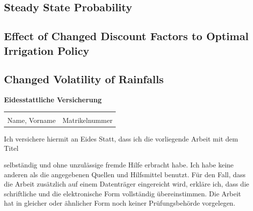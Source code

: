 \documentclass[12pt, a4paper, oneside]{article}
\begin{document}
	\subsection{Steady State Probability}
	\subsection{Effect of Changed Discount Factors to Optimal Irrigation Policy}
	\subsection{Changed Volatility of Rainfalls}

	\printbibliography

	\newpage
	
	
	
	\begingroup
	\begin{center}
		\large
		\textbf{Eidesstattliche Versicherung}
	\end{center}
	
	\vspace{0.3cm}
	
	\begin{tabular}{@{}p{8cm}p{5.8cm}}
		\underline{\hspace{6cm}} & \underline{\hspace{5.8cm}} \\
		\vspace{0.02cm}Name, Vorname & \vspace{0.02cm}Matrikelnummer \\
	\end{tabular}
	\vspace{0.3cm}
	
	Ich versichere hiermit an Eides Statt, dass ich die vorliegende Arbeit mit dem Titel

	\begin{center}
		{\makeatletter{\emph{{\@title}}}\makeatother}
	\end{center}
	
	selbständig und ohne unzulässige fremde Hilfe erbracht habe. Ich habe keine anderen als die angegebenen Quellen und Hilfsmittel benutzt. Für den Fall, dass die Arbeit zusätzlich auf einem Datenträger eingereicht wird, erkläre ich, dass die schriftliche und die elektronische Form vollständig übereinstimmen. Die Arbeit hat in gleicher oder ähnlicher Form noch keiner Prüfungsbehörde vorgelegen.
	
\end{document}
